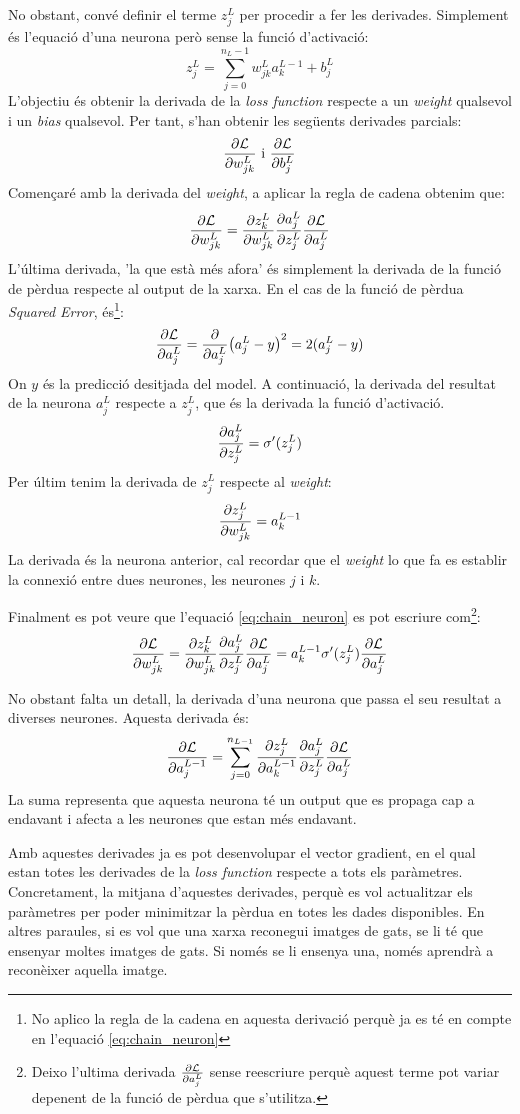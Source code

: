 No obstant, convé definir el terme $z_j^L$ per procedir a fer les derivades. Simplement és l'equació d'una neurona però sense la funció d'activació:
$$
z_j^L = \sum_{j=0}^{n_L - 1}w^L_{jk} a^{L-1}_k+ b_j^L
$$
L'objectiu és obtenir la derivada de la \textit{loss function} respecte a un \textit{weight} qualsevol i un \textit{bias} qualsevol. Per tant, s'han obtenir les següents derivades parcials:
$$
\pdv{\mathcal{L}}{w_{jk}^L} \text{ i } \pdv{\mathcal{L}}{b_j^L}
$$
Començaré amb la derivada del \textit{weight}, a aplicar la regla de cadena obtenim que:
\begin{equation}
	\pdv{\mathcal{L}}{w_{jk}^L} = \pdv{z_k^L}{w_{jk}^L}\pdv{a_j^L}{z_j^L}\pdv{\mathcal{L}}{a_j^L}
	\label{eq:chain_neuron}
\end{equation}
L'última derivada, 'la que està més afora' és simplement la derivada de la funció de pèrdua respecte al output de la xarxa. En el cas de la funció de pèrdua \textit{Squared Error}, és\footnote{No aplico la regla de la cadena en aquesta derivació perquè ja es té en compte en l'equació \ref{eq:chain_neuron}}:
$$
\pdv{\mathcal{L}}{a_j^L} =  \pdv{a_j^L} (a_j^L - y)^2 = 2(a_j^L - y)
$$
On $y$ és la predicció desitjada del model. A continuació, la derivada del resultat de la neurona $a_j^L$ respecte a $z_j^L$, que és la derivada la funció d'activació.
$$
\pdv{a_j^L}{z_j^L} = \sigma'(z_j^L)
$$
Per últim tenim la derivada de $z_j^L$ respecte al \textit{weight}:
$$
\pdv{z_j^L}{w_{jk}^L} = a^{L-1}_k
$$
La derivada és la neurona anterior, cal recordar que el \textit{weight} lo que fa es establir la connexió entre dues neurones, les neurones $j$ i $k$. 

Finalment es pot veure que l'equació \ref{eq:chain_neuron} es pot escriure com\footnote{Deixo l'ultima derivada $\pdv{\mathcal{L}}{a_j^L}$ sense reescriure perquè aquest terme pot variar depenent de la funció de pèrdua que s'utilitza.}:
$$
	\pdv{\mathcal{L}}{w_{jk}^L} = \pdv{z_k^L}{w_{jk}^L}\pdv{a_j^L}{z_j^L}\pdv{\mathcal{L}}{a_j^L} = 
	a^{L-1}_k \sigma'(z_j^L)\pdv{\mathcal{L}}{a_j^L}
$$

No obstant falta un detall, la derivada d'una neurona que passa el seu resultat a diverses neurones. Aquesta derivada és:
$$
\pdv{\mathcal{L}}{a_j^{L-1}} = \sum_{j=0}^{n_{L-1}} \pdv{z_j^L}{a_k^{L-1}}\pdv{a_j^L}{z_j^L}\pdv{\mathcal{L}}{a_j^L}
$$
La suma representa que aquesta neurona té un output que es propaga cap a endavant i afecta a les neurones que estan més endavant. 

Amb aquestes derivades ja es pot desenvolupar el vector gradient, en el qual estan totes les derivades de la \textit{loss function} respecte a tots els paràmetres. Concretament, la mitjana d'aquestes derivades, perquè es vol actualitzar els paràmetres per poder minimitzar la pèrdua en totes les dades disponibles. En altres paraules, si es vol que una xarxa reconegui imatges de gats, se li té que ensenyar moltes imatges de gats. Si només se li ensenya una, només aprendrà a reconèixer aquella imatge. 

